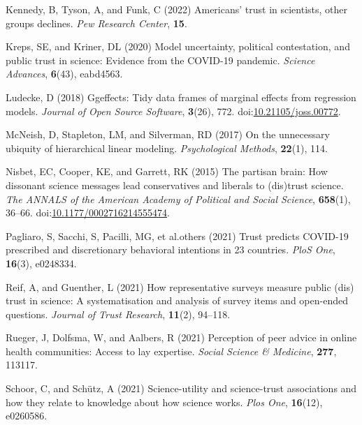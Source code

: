 \documentclass[
  single column]{article}
\newlength{\cslhangindent}
\newenvironment{CSLReferences}[2] %
 {\begin{list}{}{%
  \setlength{\itemindent}{0pt}
  \setlength{\leftmargin}{0pt}
  \setlength{\parsep}{0pt}
  \ifodd #1
   \setlength{\leftmargin}{\cslhangindent}
   \setlength{\itemindent}{-1\cslhangindent}
  \fi
  \setlength{\itemsep}{#2\baselineskip}}}
 {\end{list}}
\begin{document}
\begin{CSLReferences}{1}{0}
Kennedy, B, Tyson, A, and Funk, C (2022) Americans' trust in scientists,
other groups declines. \emph{Pew Research Center}, \textbf{15}.

Kreps, SE, and Kriner, DL (2020) Model uncertainty, political
contestation, and public trust in science: Evidence from the COVID-19
pandemic. \emph{Science Advances}, \textbf{6}(43), eabd4563.

Ludecke, D (2018) Ggeffects: Tidy data frames of marginal effects from
regression models. \emph{Journal of Open Source Software},
\textbf{3}(26), 772.
doi:\href{https://doi.org/10.21105/joss.00772}{10.21105/joss.00772}.

McNeish, D, Stapleton, LM, and Silverman, RD (2017) On the unnecessary
ubiquity of hierarchical linear modeling. \emph{Psychological Methods},
\textbf{22}(1), 114.

Nisbet, EC, Cooper, KE, and Garrett, RK (2015) The partisan brain: How
dissonant science messages lead conservatives and liberals to (dis)trust
science. \emph{The ANNALS of the American Academy of Political and
Social Science}, \textbf{658}(1), 36--66.
doi:\href{https://doi.org/10.1177/0002716214555474}{10.1177/0002716214555474}.

Pagliaro, S, Sacchi, S, Pacilli, MG, et al.others (2021) Trust predicts
COVID-19 prescribed and discretionary behavioral intentions in 23
countries. \emph{PloS One}, \textbf{16}(3), e0248334.

Reif, A, and Guenther, L (2021) How representative surveys measure
public (dis) trust in science: A systematisation and analysis of survey
items and open-ended questions. \emph{Journal of Trust Research},
\textbf{11}(2), 94--118.

Rueger, J, Dolfsma, W, and Aalbers, R (2021) Perception of peer advice
in online health communities: Access to lay expertise. \emph{Social
Science \& Medicine}, \textbf{277}, 113117.

Schoor, C, and Schütz, A (2021) Science-utility and science-trust
associations and how they relate to knowledge about how science works.
\emph{Plos One}, \textbf{16}(12), e0260586.


\end{CSLReferences}
\end{document}
